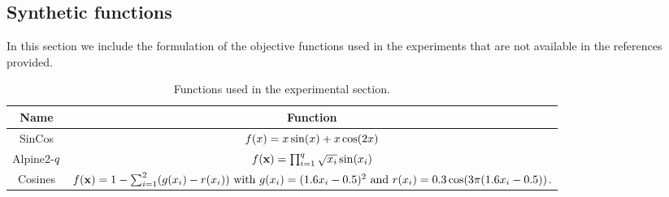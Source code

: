 \documentclass[twoside]{article}
\begin{document}
\subsection{Synthetic functions}

In this section we include the formulation of the objective functions used in the experiments that are not available in the references provided. 


\begin{table}[h!]
\centering
\begin{tabular}{cc}
\toprule
Name & Function     \\
\midrule
SinCos & $f(x) = x \sin(x) + x \cos(2x)$  \\
Alpine2-$q$ & $f(\mathbf{x}) =\prod_{i=1}^{q} \sqrt{x_i}\sin(x_i)$  \\
Cosines &  $f(\mathbf{x}) = 1- \sum_{i=1}^2 (g(x_i) - r(x_i) )  \mbox{ with } g(x_i) = (1.6x_i - 0.5)^2 \mbox{ and } r(x_i) = 0.3 \cos (3\pi (1.6 x_i -0.5))$. \\
\bottomrule
\end{tabular}\caption{Functions used in the experimental section.}\label{table:functions_test}
\end{table}

\end{document}
